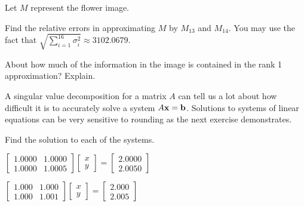 \begin{activity} Let $M$ represent the flower image.
	\ba
	\item Find the relative errors in approximating $M$ by $M_{13}$ and $M_{14}$. You may use the fact that  $\sqrt{\sum_{i=1}^{16} \sigma_i^2} \approx 3102.0679$.



	\item About how much of the information in the image is contained in the rank 1 approximation? Explain.
	
	
	
	\ea
\end{activity}


\label{sec:mtx_cond_num}

A singular value decomposition for a matrix $A$ can tell us a lot about how difficult it is to accurately solve a system $A \mathbf{x} = \mathbf{b}$. Solutions to systems of linear equations can be very sensitive to rounding as the next exercise demonstrates.



\begin{activity} \label{act:7_c_cond_num} Find the solution to each of the systems.
	\ba
	\item $\left[ \begin{array}{cc} 1.0000&1.0000 \\ 1.0000&1.0005 \end{array} \right] \left[ \begin{array}{c} x \\ y \end{array} \right] = \left[ \begin{array}{c} 2.0000 \\ 2.0050 \end{array} \right]$
	
	
	
	\item $\left[ \begin{array}{cc} 1.000&1.000 \\ 1.000&1.001 \end{array} \right] \left[ \begin{array}{c} x \\ y \end{array} \right] = \left[ \begin{array}{c} 2.000 \\ 2.005 \end{array} \right]$

	
	
	\ea
\end{activity}

